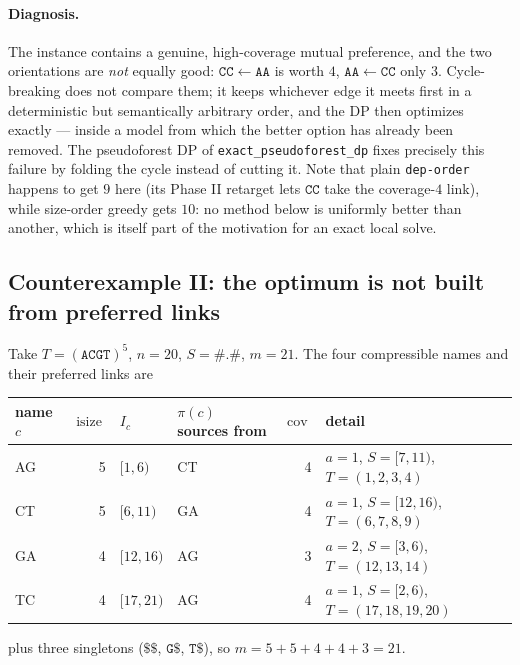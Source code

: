 \documentclass[11pt,a4paper]{article}
\theoremstyle{definition}
\theoremstyle{plain}
\theoremstyle{remark}
\newcommand{\cov}{\operatorname{cov}}
\newcommand{\isize}{\operatorname{isize}}
\begin{document}
\paragraph{Diagnosis.}
The instance contains a genuine, high-coverage mutual preference, and the
two orientations are \emph{not} equally good: $\mathtt{CC}\!\leftarrow\!\mathtt{AA}$
is worth $4$, $\mathtt{AA}\!\leftarrow\!\mathtt{CC}$ only $3$.
Cycle-breaking does not compare them; it keeps whichever edge it meets
first in a deterministic but semantically arbitrary order, and the DP
then optimizes exactly --- inside a model from which the better option
has already been removed. The pseudoforest DP of
\texttt{exact\_pseudoforest\_dp} fixes precisely this failure by folding
the cycle instead of cutting it. Note that plain \texttt{dep-order}
happens to get $9$ here (its Phase II retarget lets $\mathtt{CC}$ take
the coverage-$4$ link), while size-order greedy gets $10$: no method
below is uniformly better than another, which is itself part of the
motivation for an exact local solve.

\subsection{Counterexample II: the optimum is not built from preferred links}
\label{sec:ce2}

Take $T = (\mathtt{ACGT})^5$, $n = 20$, $S = \mathtt{\#.\#}$, $m = 21$.
The four compressible names and their preferred links are

\begin{center}
\small
\begin{tabular}{@{}lrllrl@{}}
\toprule
name $c$ & $\isize$ & $I_c$ & $\pi(c)$ sources from & $\cov$ & detail \\
\midrule
AG & 5 & $[1,6)$   & CT & 4 & $a=1$, $S = [7,11)$,  $T = (1,2,3,4)$ \\
CT & 5 & $[6,11)$  & GA & 4 & $a=1$, $S = [12,16)$, $T = (6,7,8,9)$ \\
GA & 4 & $[12,16)$ & AG & 3 & $a=2$, $S = [3,6)$,   $T = (12,13,14)$ \\
TC & 4 & $[17,21)$ & AG & 4 & $a=1$, $S = [2,6)$,   $T = (17,18,19,20)$ \\
\bottomrule
\end{tabular}
\end{center}

plus three singletons ($\mathtt{\$\$}$, $\mathtt{G\$}$, $\mathtt{T\$}$),
so $m = 5+5+4+4+3 = 21$.
\end{document}
